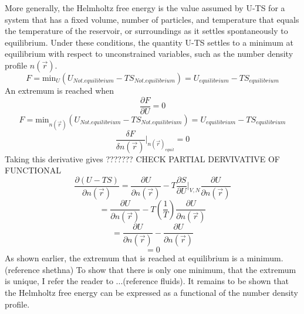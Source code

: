\documentclass[12pt]{article}
\begin{document}
More generally, the Helmholtz free energy is the value assumed by U-TS for a system that has a fixed volume, number of particles, and temperature that equals the temperature of the reservoir, or surroundings as it settles spontaneously to equilibrium. Under these conditions, the quantity U-TS settles to a minimum at equilibrium with respect to unconstrained variables, such as the number density profile $n(\vec r)$.
\begin{equation}F=\text{min}_{U}(U_{Not.equilibrium} - TS_{Not.equilibrium}) = U_{equilibrium}-TS_{equilibrium}\end{equation}
An extremum is reached when
\begin{equation}\frac{\partial{F}}{\partial{U}}=0\end{equation}
\color{red} 
\begin{equation}F=\text{min}_{n(\vec{r})}(U_{Not.equilibrium} - TS_{Not.equilibrium}) = U_{equilibrium}-TS_{equilibrium}\end{equation} 
\color{red} 
\begin{equation}\frac{\delta{F}}{\delta{n(\vec r)}}\bigg|_{n(\vec{r})_{equil}}=0\end{equation}
Taking this derivative gives  ??????? CHECK PARTIAL DERVIVATIVE OF FUNCTIONAL 
\begin{equation}\frac{\partial{(U-TS)}}{\partial{n(\vec r)}}=\frac{\partial{U}}{\partial{n(\vec r)}}-T\frac{\partial{S}}{\partial{U}}\bigg|_{V,N}\frac{\partial{U}}{\partial{n(\vec r)}}\end{equation}
\begin{equation}=\frac{\partial{U}}{\partial{n(\vec r)}}-T\left(\frac{1}{T}\right)\frac{\partial{U}}{\partial{n(\vec r)}}\end{equation}
\begin{equation}=\frac{\partial{U}}{\partial{n(\vec r)}}-\frac{\partial{U}}{\partial{n(\vec r)}}\end{equation}
\begin{equation}=0\end{equation}
\color{black}
As shown earlier, the extremum that is reached at equilibrium is a minimum. (reference shethna) \color{red} To show that there is only one minimum, that the extremum is unique, I refer the reader to ...(reference fluids). \color{black} It remains to be shown that the Helmholtz free energy can be expressed as a functional of the number density profile.
\end{document}
